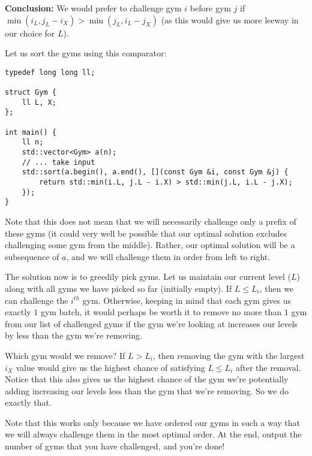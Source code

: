 \documentclass{article}
\begin{document}
\textbf{Conclusion:} We would prefer to challenge gym $i$ before gym $j$ if $\min(i_L,j_L-i_X) > \min(j_L,i_L-j_X)$ (as this would give us more leeway in our choice for $L$).

Let us sort the gyms using this comparator:
\begin{verbatim}
typedef long long ll;

struct Gym {
    ll L, X;
};

int main() {
    ll n;
    std::vector<Gym> a(n);
    // ... take input
    std::sort(a.begin(), a.end(), [](const Gym &i, const Gym &j) {
        return std::min(i.L, j.L - i.X) > std::min(j.L, i.L - j.X);
    });
}
\end{verbatim}
 
Note that this does not mean that we will necessarily challenge only a prefix of these gyms (it could very well be possible that our optimal solution excludes challenging some gym from the middle). Rather, our optimal solution will be a subsequence of $a$, and we will challenge them in order from left to right.

The solution now is to greedily pick gyms. Let us maintain our current level ($L$) along with all gyms we have picked so far (initially empty). If $L\le L_i$, then we can challenge the $i^{th}$ gym. Otherwise, keeping in mind that each gym gives us exactly $1$ gym batch, it would perhaps be worth it to remove no more than $1$ gym from our list of challenged gyms if the gym we're looking at increases our levels by less than the gym we're removing.

Which gym would we remove? If $L>L_i$, then removing the gym with the largest $i_X$ value would give us the highest chance of satisfying $L\le L_i$ after the removal. Notice that this also gives us the highest chance of the gym we're potentially adding increasing our levels less than the gym that we're removing. So we do exactly that.

Note that this works only because we have ordered our gyms in such a way that we will always challenge them in the most optimal order. At the end, output the number of gyms that you have challenged, and you're done!
\end{document}
